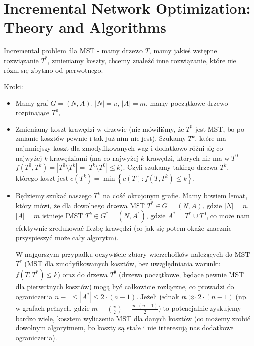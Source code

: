 \chapter{Incremental Network Optimization: Theory and Algorithms}
\thispagestyle{chapterBeginStyle}

Incremental problem dla MST - mamy drzewo $T$, mamy jakieś wstępne rozwiązanie $T^{\ast}$, zmieniamy koszty, chcemy znaleźć inne rozwiązanie, które nie różni się zbytnio od pierwotnego.

Kroki:
\begin{itemize}
	\item Mamy graf $G = \left( N, A \right)$, $\left| N \right| = n$, $\left| A \right| = m$, mamy początkowe drzewo rozpinające $T^{0}$,
	\item Zmieniamy koszt krawędzi w drzewie (nie mówiliśmy, że $T^{0}$ jest MST, bo po zmianie kosztów pewnie i tak już nim nie jest). Szukamy $T^{k}$, które ma najmniejszy koszt dla zmodyfikowanych wag i dodatkowo różni się co najwyżej $k$ krawędziami (ma co najwyżej $k$ krawędzi, których nie ma w $T^{0}$ --- $f \left( T^{0}, T^{k} \right) = \left| T^{0} \setminus T^{k} \right| = \left| T^{k} \setminus T^{0} \right| \leqslant k$). Czyli szukamy takiego drzewa $T^{k}$, którego koszt jest $c \left( T^{k} \right) = \min \left\{ c \left( T \right) : f \left( T, T^{k} \right) \leqslant k \right\}$.
	\item Będziemy szukać naszego $T^{k}$ na dość okrojonym grafie. Mamy bowiem lemat, który mówi, że dla dowolnego drzewa MST $T^{\ast} \in G = \left( N, A \right)$, gdzie $\left| N \right| = n$, $\left| A \right| = m$ istnieje IMST $T^{k} \in G^{\ast} = \left( N, A^{\ast} \right)$, gdzie $A^{\ast} = T^{\ast} \cup T^{0}$, co może nam efektywnie zredukować liczbę krawędzi (co jak się potem okaże znacznie przyspieszyć może cały algorytm).
	
	W najgorszym przypadku oczywiście zbiory wierzchołków należących do MST $T^{\ast}$ (MST dla zmodyfikowanych kosztów, bez uwzględniania warunku $f \left( T, T^{*} \right) \leqslant k$) oraz do drzewa $T^{0}$ (drzewo początkowe, będące pewnie MST dla pierwotnych kosztów) mogą być całkowicie rozłączne, co prowadzi do ograniczenia $n - 1 \leqslant \left| A^{\ast} \right| \leqslant 2 \cdot \left( n - 1 \right)$. Jeżeli jednak $m \gg 2 \cdot \left( n - 1 \right)$ (np. w grafach pełnych, gdzie $m = \binom{n}{2} = \frac{n \cdot \left( n - 1 \right)}{2}$) to potencjalnie zyskujemy bardzo wiele, kosztem wyliczenia MST dla danych kosztów (co możemy zrobić dowolnym algorytmem, bo koszty są stałe i nie interesują nas dodatkowe ograniczenia).
	

\end{itemize}
